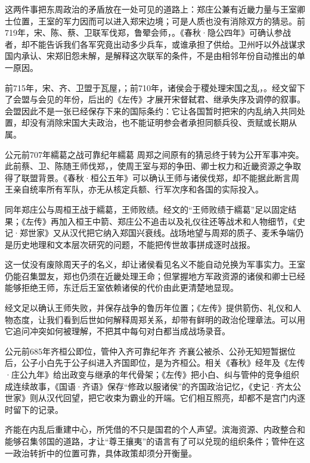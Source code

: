 这两件事把东周政治的矛盾放在一处可见的道路上：郑庄公兼有近畿力量与王室卿士位置，王室的军力因而可以进入郑宋边境；可是人质也没有消除双方的猜忌。前719年，宋、陈、蔡、卫联军伐郑，鲁翚会师，。《春秋·隐公四年》可确认参战者，却不能告诉我们各军究竟出动多少兵车，或谁承担了供给。卫州吁以外战谋求国内承认、宋郑旧怨未解，是解释这次联军的条件，不是由相邻年份自动推出的单一原因。

前715年，宋、齐、卫盟于瓦屋，；前710年，诸侯会于稷处理宋国之乱，。经文留下了会盟与会见的年份，后出的《左传》才展开宋督弑君、继承失序及调停的叙事。会盟因此不是一张已经保存下来的国际条约：它让各国暂时把宋的内乱纳入共同处置，却没有消除宋国大夫政治，也不能证明参会者承担同额兵役、贡赋或长期从属。

\begin{event}{公元前707年}{繻葛之战}{可靠纪年}{繻葛}
周郑之间原有的猜忌终于转为公开军事冲突。此前蔡、卫、陈随王师伐郑，，使周王室与郑的争田、卿士权力和近畿资源之争取得了联盟背景。《春秋·桓公五年》可以确认王师与诸侯伐郑，却不能据此断言周王亲自统率所有军队，亦无从核定兵额、行军次序和各国的实际投入。

同年郑庄公与周桓王战于繻葛，王师败绩。经文的“王师败绩于繻葛”足以固定结果；《左传》再加入桓王中箭、郑庄公不追击以及礼仪往还等战术和人物细节，《史记·郑世家》又从汉代把它纳入郑国兴衰线。战场地望与周郑的质子、麦禾争端仍是历史地理和文本层次研究的问题，不能把传世故事拼成逐时战报。

这一仗没有废除周天子的名义，却让诸侯看见名义不能自动兑换为军事实力。王室仍能召集盟友，郑也仍须在近畿处理王命；但掌握地方军政资源的诸侯和卿士已经能够拒绝王师，东迁后王室依赖诸侯的代价由此更清楚地显现。
\end{event}

\begin{sourcenote}[繻葛：经文与叙事的距离]
经文足以确认王师失败，并保存战争的鲁历年位置；《左传》提供箭伤、礼仪和人物态度，让我们看到后世如何解释周郑关系，却带有鲜明的政治伦理章法。可以用它追问冲突如何被理解，不把其中每句对白都当成战场录音。
\end{sourcenote}

\begin{event}{公元前685年}{齐桓公即位，管仲入齐}{可靠纪年}{齐}
齐襄公被杀、公孙无知短暂据位后，公子小白先于公子纠进入齐国即位，是为齐桓公。相关《春秋》经年及《左传·庄公九年》给出政变与继承的年代骨架；《左传》把小白、纠与管仲的竞争组织成连续故事，《国语·齐语》保存“修政以服诸侯”的齐国政治记忆，《史记·齐太公世家》则从汉代回望，把它收束为霸业的开端。它们相互照亮，却都不是宫门内逐时留下的记录。

齐能在内乱后重建中心，所凭借的不只是国君的个人声望。滨海资源、内政整合和能够召集邻国的道路，才让“尊王攘夷”的语言有了可以兑现的组织条件；管仲在这一政治转折中的位置可靠，具体政策却须分开衡量。
\end{event}

